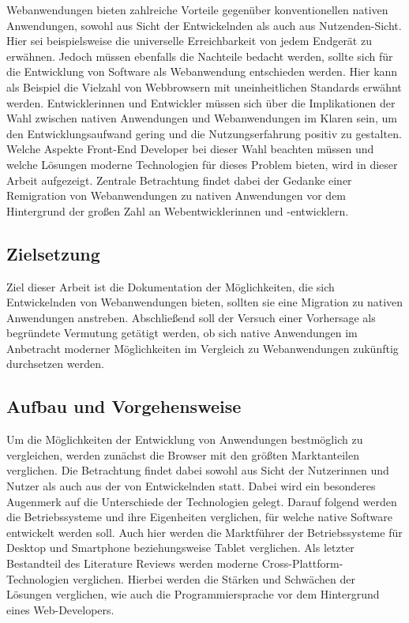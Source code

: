 \documentclass[a4paper]{scrartcl}
\begin{document}
Webanwendungen bieten zahlreiche Vorteile gegenüber konventionellen nativen Anwendungen, sowohl aus Sicht der Entwickelnden als auch aus Nutzenden-Sicht. Hier sei beispielsweise die universelle Erreichbarkeit von jedem Endgerät zu erwähnen. Jedoch müssen ebenfalls die Nachteile bedacht werden, sollte sich für die Entwicklung von Software als Webanwendung entschieden werden. Hier kann als Beispiel die Vielzahl von Webbrowsern mit uneinheitlichen Standards erwähnt werden. Entwicklerinnen und Entwickler müssen sich über die Implikationen der Wahl zwischen nativen Anwendungen und Webanwendungen im Klaren sein, um den Entwicklungsaufwand gering und die Nutzungserfahrung positiv zu gestalten. Welche Aspekte Front-End Developer bei dieser Wahl beachten müssen und welche Lösungen moderne Technologien für dieses Problem bieten, wird in dieser Arbeit aufgezeigt. Zentrale Betrachtung findet dabei der Gedanke einer Remigration von Webanwendungen zu nativen Anwendungen vor dem Hintergrund der großen Zahl an Webentwicklerinnen und -entwicklern.

\subsection{Zielsetzung}
Ziel dieser Arbeit ist die Dokumentation der Möglichkeiten, die sich Entwickelnden von Webanwendungen bieten, sollten sie eine Migration zu nativen Anwendungen anstreben. Abschließend soll der Versuch einer Vorhersage als begründete Vermutung getätigt werden, ob sich native Anwendungen im Anbetracht moderner Möglichkeiten im Vergleich zu Webanwendungen zukünftig durchsetzen werden. 

\subsection{Aufbau und Vorgehensweise}
Um die Möglichkeiten der Entwicklung von Anwendungen bestmöglich zu vergleichen, werden zunächst die Browser mit den größten Marktanteilen verglichen. Die Betrachtung findet dabei sowohl aus Sicht der Nutzerinnen und Nutzer als auch aus der von Entwickelnden statt. Dabei wird ein besonderes Augenmerk auf die Unterschiede der Technologien gelegt. Darauf folgend werden die Betriebssysteme und ihre Eigenheiten verglichen, für welche native Software entwickelt werden soll. Auch hier werden die Marktführer der Betriebssysteme für Desktop und Smartphone beziehungsweise Tablet verglichen. Als letzter Bestandteil des Literature Reviews werden moderne Cross-Plattform-Technologien verglichen. Hierbei werden die Stärken und Schwächen der Lösungen verglichen, wie auch die Programmiersprache vor dem Hintergrund eines Web-Developers. \\
\end{document}
